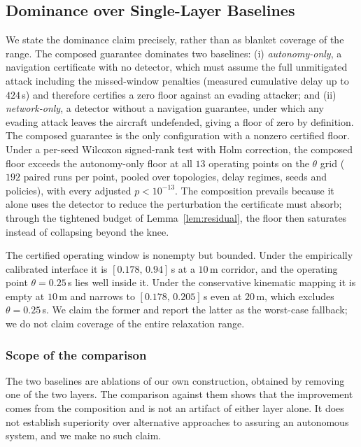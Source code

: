 \subsection{Dominance over Single-Layer Baselines}
\label{sec:dominance}
We state the dominance claim precisely, rather than as blanket coverage of the
range. The composed guarantee dominates two baselines: (i) \emph{autonomy-only},
a navigation certificate with no detector, which must assume the full
unmitigated attack including the missed-window penalties (measured cumulative
delay up to $424$\,s) and therefore certifies a zero floor against an evading
attacker; and (ii) \emph{network-only}, a detector without a navigation
guarantee, under which any evading attack leaves the aircraft undefended, giving
a floor of zero by definition. The composed guarantee is the only
configuration with a nonzero certified floor. Under a per-seed Wilcoxon
signed-rank test with Holm correction, the composed floor exceeds the
autonomy-only floor at all $13$ operating points on the $\theta$ grid
($192$ paired runs per point, pooled over topologies, delay regimes, seeds and
policies), with every adjusted $p<10^{-13}$. The composition prevails because it alone uses the
detector to reduce the perturbation the certificate must absorb; through
the tightened budget of Lemma~\ref{lem:residual}, the floor then saturates
instead of collapsing beyond the knee.

The certified operating window is nonempty but bounded. Under the
empirically calibrated interface it is $[0.178,\,0.94]$\,s at a $10$\,m
corridor, and the operating point $\theta=0.25$\,s lies well inside it. Under
the conservative kinematic mapping it is empty at $10$\,m and narrows to
$[0.178,\,0.205]$\,s even at $20$\,m, which excludes $\theta=0.25$\,s. We claim
the former and report the latter as the worst-case fallback; we do not claim
coverage of the entire relaxation range.

\subsubsection*{Scope of the comparison}
The two baselines are ablations of our own construction, obtained by removing
one of the two layers. The comparison against them shows that the improvement
comes from the composition and is not an artifact of either layer alone. It
does not establish superiority over alternative approaches to assuring an
autonomous system, and we make no such claim.

